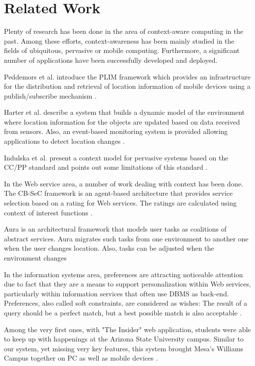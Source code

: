 \documentclass{acm_proc_article-sp}
\begin{document}
\section{Related Work}
Plenty of research has been done in the area of context-aware computing in the past. Among these efforts, context-awareness has been mainly studied in the fields of ubiquitous, pervasive or mobile computing. Furthermore, a significant number of applications have been
successfully developed and deployed. 

Peddemors et al. introduce the PLIM framework which provides an infrastructure for the distribution and retrieval of location information of mobile devices using a publish/subscribe mechanism \cite{peddemors:lbs}.

Harter et al. describe a system that builds a dynamic model of the environment where location information for the objects are updated based on data received from sensors. Also, an event-based monitoring system is provided allowing applications to detect location changes \cite{harter:anatomy}. 

Indulska et al. present a context model for pervasive systems based on the CC/PP standard and points out some limitations of this standard  \cite{indulska:ccpp}.

In the Web service area, a number of work dealing with context has been done. The CB-SeC framework is an agent-based architecture that provides service selection based on a rating for Web services. The ratings are calculated using context of interest functions \cite{maamar:contextualisation}. 

Aura is an architectural framework that models user tasks as coalitions of abstract services. Aura migrates such tasks from one environment to another one when the user changes location. Also, tasks can be adjusted when the environment changes \cite{sousa:mobility}

In the information systems area, preferences are attracting noticeable attention due to fact that they are a means to support personalization within Web services, particularly within information services that often use DBMS as back-end. Preferences, also called soft constraints, are considered as wishes: The result of a query should be a perfect match, but a best possible match is also acceptable \cite{kießling:optimizing,agrawal:preferences,chomicki:intrinsic}.

Among the very first ones, with "The Insider" web application, students were able to keep up with happenings at the Arizona State University campus. Similar to our system, yet missing very key features, this system brought Mesa's Williams Campus together on PC as well as mobile devices \cite{valenzuela:insider,gellersen:multisensor}.
\end{document}
